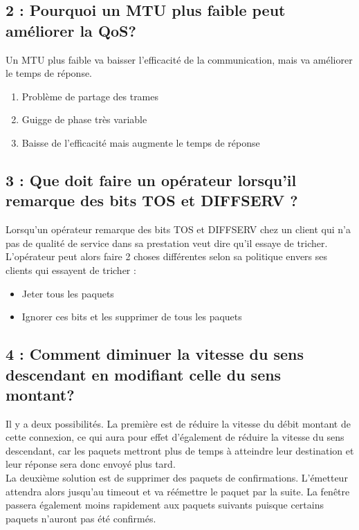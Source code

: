 \documentclass{article}
\begin{document}
\subsection*{2 : Pourquoi un MTU plus faible peut améliorer la QoS?}

Un MTU plus faible va baisser l'efficacité de la communication, mais va améliorer le temps de réponse.
\begin{enumerate}
\item Problème de partage des trames
\item Guigge de phase très variable
\item Baisse de l'efficacité mais augmente le temps de réponse
\end{enumerate}

\subsection*{3 : Que doit faire un opérateur lorsqu'il remarque des bits TOS et DIFFSERV ?}

Lorsqu'un opérateur remarque des bits TOS \cite{ToS} et DIFFSERV \cite{DiffServ} chez un client qui n'a pas de qualité de service dans sa prestation veut dire qu'il essaye de tricher.\\

L'opérateur peut alors faire 2 choses différentes selon sa politique envers ses clients qui essayent de tricher : 

\begin{itemize}
 	\item Jeter tous les paquets
 	\item Ignorer ces bits et les supprimer de tous les paquets
\end{itemize}

\subsection*{4 : Comment diminuer la vitesse du sens descendant en modifiant celle du sens montant?}

Il y a deux possibilités. La première est de réduire la vitesse du débit montant de cette connexion, ce qui aura pour effet d'également de réduire la vitesse du sens descendant, car les paquets mettront plus de temps à atteindre leur destination et leur réponse sera donc envoyé plus tard.\\

La deuxième solution est de supprimer des paquets de confirmations. L'émetteur attendra alors jusqu'au timeout et va réémettre le paquet par la suite. La fenêtre passera également moins rapidement aux paquets suivants puisque certains paquets n'auront pas été confirmés.
\end{document}
